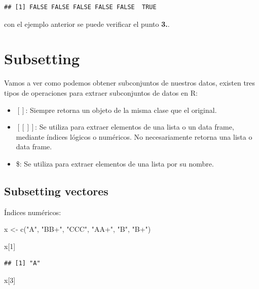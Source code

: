 \documentclass[
  12pt,
]{book}
\newenvironment{Shaded}{\begin{snugshade}}{\end{snugshade}}
\newcommand{\DecValTok}[1]{\textcolor[rgb]{0.00,0.00,0.81}{#1}}
\newcommand{\FunctionTok}[1]{\textcolor[rgb]{0.00,0.00,0.00}{#1}}
\newcommand{\NormalTok}[1]{#1}
\newcommand{\OtherTok}[1]{\textcolor[rgb]{0.56,0.35,0.01}{#1}}
\newcommand{\StringTok}[1]{\textcolor[rgb]{0.31,0.60,0.02}{#1}}
\providecommand{\tightlist}{%
  \setlength{\itemsep}{0pt}\setlength{\parskip}{0pt}}
\begin{document}
\begin{verbatim}
## [1] FALSE FALSE FALSE FALSE FALSE  TRUE
\end{verbatim}

con el ejemplo anterior se puede verificar el punto \textbf{3.}.

\hypertarget{subsetting}{%
\chapter{\texorpdfstring{\textbf{Subsetting}}{Subsetting}}\label{subsetting}}

Vamos a ver como podemos obtener subconjuntos de nuestros datos, existen tres tipos de operaciones para extraer subconjuntos de datos en R:

\begin{itemize}
\tightlist
\item
  \([ ]\): Siempre retorna un objeto de la misma clase que el original.
\item
  \([[ ]]\): Se utiliza para extraer elementos de una lista o un data frame, mediante índices lógicos o numéricos. No necesariamente retorna una lista o data frame.
\item
  \$: Se utiliza para extraer elementos de una lista por su nombre.
\end{itemize}

\hypertarget{subsetting-vectores}{%
\section{\texorpdfstring{\textbf{Subsetting vectores}}{Subsetting vectores}}\label{subsetting-vectores}}

Índices numéricos:

\begin{Shaded}
\begin{Highlighting}[]
\NormalTok{x }\OtherTok{\textless{}{-}} \FunctionTok{c}\NormalTok{(}\StringTok{"A"}\NormalTok{, }\StringTok{"BB+"}\NormalTok{, }\StringTok{"CCC"}\NormalTok{, }\StringTok{"AA+"}\NormalTok{, }\StringTok{"B"}\NormalTok{, }\StringTok{"B+"}\NormalTok{)}

\NormalTok{x[}\DecValTok{1}\NormalTok{]}
\end{Highlighting}
\end{Shaded}

\begin{verbatim}
## [1] "A"
\end{verbatim}

\begin{Shaded}
\begin{Highlighting}[]
\NormalTok{x[}\DecValTok{3}\NormalTok{]}
\end{Highlighting}
\end{Shaded}
\end{document}
